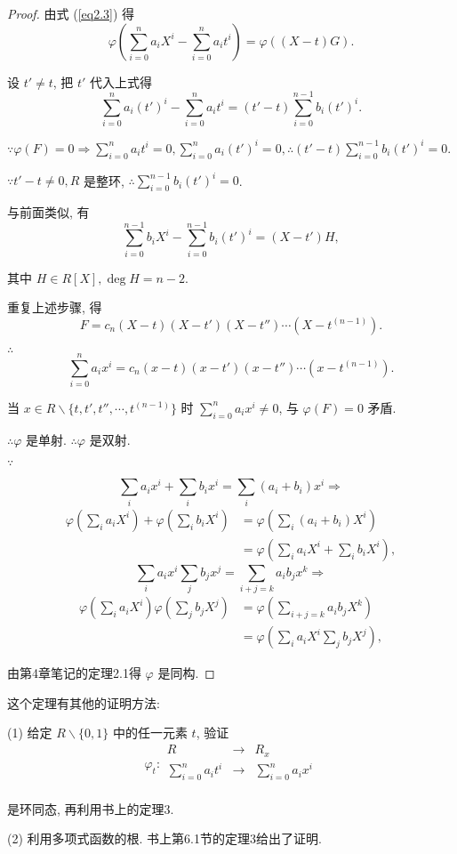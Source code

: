 \documentclass[color=black,device=normal,lang=cn,mode=geye]{elegantnote}
\begin{document}
\begin{proof}
    由式 (\ref{eq2.3}) 得
    \[\varphi\left(\sum\limits_{i=0}^{n}a_iX^i-\sum\limits_{i=0}^{n}a_it^i\right)=\varphi\left((X-t)G\right).\]

    设 $t'\neq t$, 把 $t'$ 代入上式得
    \[\sum\limits_{i=0}^{n}a_i(t')^i-\sum\limits_{i=0}^{n}a_it^i=(t'-t)\sum\limits_{i=0}^{n-1}b_i(t')^i.\]

    $\because\varphi(F)=0\Rightarrow\sum\limits_{i=0}^{n}a_it^i=0,\sum\limits_{i=0}^{n}a_i(t')^i=0,\therefore(t'-t)\sum\limits_{i=0}^{n-1}b_i(t')^i=0$.

    $\because t'-t\neq0,R$ 是整环, $\therefore\sum\limits_{i=0}^{n-1}b_i(t')^i=0$.

    与前面类似, 有
    \[\sum\limits_{i=0}^{n-1}b_iX^i-\sum\limits_{i=0}^{n-1}b_i(t')^i=(X-t')H,\]

    其中 $H\in R[X],\deg H=n-2$.

    重复上述步骤, 得
    \[F=c_n(X-t)(X-t')(X-t'')\cdots(X-t^{(n-1)}).\]

    $\therefore$
    \[\sum\limits_{i=0}^{n}a_ix^i=c_n(x-t)(x-t')(x-t'')\cdots(x-t^{(n-1)}).\]

    当 $x\in R\backslash\{t,t',t'',\cdots,t^{(n-1)}\}$ 时 $\sum\limits_{i=0}^{n}a_ix^i\neq0$, 与 $\varphi(F)=0$ 矛盾.

    $\therefore\varphi$ 是单射. $\therefore\varphi$ 是双射.

    $\because$

    \[\sum\limits_ia_ix^i+\sum\limits_ib_ix^i=\sum\limits_i(a_i+b_i)x^i\Rightarrow\]
    \begin{align*}
        \varphi\left(\sum\limits_ia_iX^i\right)+\varphi\left(\sum\limits_ib_iX^i\right) & =\varphi\left(\sum\limits_i(a_i+b_i)X^i\right) \\
        & =\varphi\left(\sum\limits_ia_iX^i+\sum\limits_ib_iX^i\right),
    \end{align*}
    \[\sum\limits_ia_ix^i\sum\limits_jb_jx^j=\sum\limits_{i+j=k}a_ib_jx^k\Rightarrow\]
    \begin{align*}
        \varphi\left(\sum\limits_ia_iX^i\right)\varphi\left(\sum\limits_jb_jX^j\right) & =\varphi\left(\sum\limits_{i+j=k}a_ib_jX^k\right) \\
        & =\varphi\left(\sum\limits_ia_iX^i\sum\limits_jb_jX^j\right),
    \end{align*}

    由第4章笔记的定理2.1得 $\varphi$ 是同构.
\end{proof}
\begin{note}
    这个定理有其他的证明方法:

    (1) 给定 $R\backslash\{0,1\}$ 中的任一元素 $t$, 验证
    \[\varphi_t:\begin{array}{rcl}
        R & \to & R_x \\
        \sum\limits_{i=0}^{n}a_it^i & \to & \sum\limits_{i=0}^{n}a_ix^i \\
    \end{array}\]

    是环同态, 再利用书上的定理3.

    (2) 利用多项式函数的根. 书上第6.1节的定理3给出了证明.
\end{note}
\end{document}
